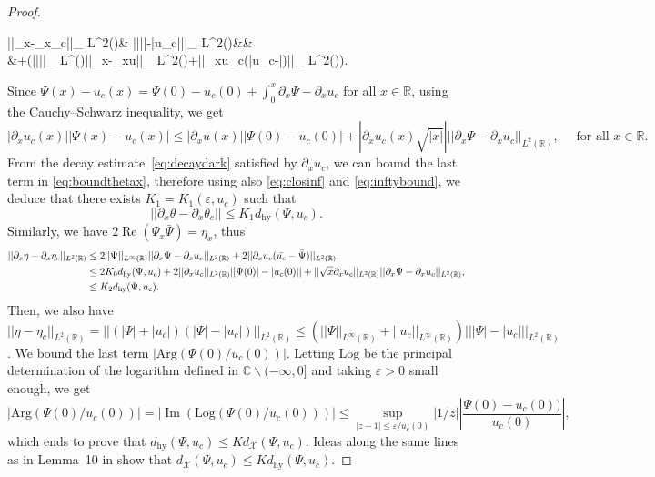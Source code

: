 \documentclass[10pt,a4paper]{amsart}
\newcommand{\C}{\mathbb{C}}
\renewcommand{\Im}{\operatorname{Im}}
\newcommand{\R}{\mathbb{R}}
\renewcommand{\Re}{\operatorname{Re}}
\begin{document}
\begin{proof}
		\begin{flalign}\label{eq:boundthetax}
			\hspace{1.3cm} ||\partial_x\theta-\partial_x\theta_c||_{ L^2(\R)}\leq& \frac{\Im(\partial_xu_c\bar{u_c})(||\Psi||_{ L^\infty(\R)}+||u_c||_{ L^\infty(\R)})}{\inf_{\R}|\Psi|^2\inf_\R|u_c|^2}|||\Psi|-|u_c|||_{ L^2(\R)}&&\notag\\
			&+\frac{1}{\inf_\R|\Psi|^2}\left(||\Psi||_{ L^\infty(\R)}||\partial_x\Psi-\partial_xu||_{ L^2(\R)}+||\partial_xu_c(\bar{u_c}-\bar{\Psi})||_{ L^2(\R)}\right).
		\end{flalign}
		Since $\Psi(x)-u_c(x)=\Psi(0)-u_c(0)+\int_{0}^x\partial_x\Psi-\partial_xu_c$ for all $x\in\R$, using the Cauchy--Schwarz inequality, we get
		\begin{equation}
			|\partial_xu_c(x)||\Psi(x)-u_c(x)|\leq|\partial_xu(x)||\Psi(0)-u_c(0)|+|\partial_{x}u_c(x)\sqrt{|x|}|||\partial_x\Psi-\partial_xu_c||_{ L^2(\R)},\quad\text{ for all }x\in\R.
		\end{equation}
		From the decay estimate~\eqref{eq:decaydark} satisfied by $\partial_xu_c$, we can bound the last term in \eqref{eq:boundthetax}, therefore using also \eqref{eq:closinf} and \eqref{eq:inftybound}, we deduce that there exists $K_1=K_1(\varepsilon,u_c)$ such that 
		\begin{equation}\label{eq:equivtheta}
			||\partial_x\theta-\partial_x\theta_c||\leq K_1d_{\mathrm{hy}}(\Psi,u_c).	
		\end{equation}
		Similarly, we have $2\Re(\Psi_x\bar\Psi)=\eta_x$, thus 
		\begin{align}
			||\partial_x\eta-\partial_x\eta_c||_{ L^2(\R)}&\leq2||\Psi||_{ L^\infty(\R)}||\partial_x\Psi-\partial_xu_c||_{ L^2(\R)}+2||\partial_x{u_c}(\bar{u_c}-\bar\Psi)||_{ L^2(\R)},\notag\\
			&\leq2K_0d_{\mathrm{hy}}(\Psi,u_c)+2||\partial_xu_c||_{ L^2(\R)}||\Psi(0)|-|u_c(0)||+||\sqrt{x}\partial_xu_c||_{ L^2(\R)}|| \partial_x\Psi-\partial_xu_c||_{ L^2(\R)}\notag,\\
			&\leq K_2 d_{\mathrm{hy}}(\Psi,u_c).
		\end{align}
		Then, we also have $||\eta-\eta_c||_{ L^2(\R)}=||(|\Psi|+|u_c|)(|\Psi|-|u_c|)||_{ L^2(\R)}\leq(||\Psi||_{ L^\infty(\R)}+||u_c||_{ L^\infty(\R)})|||\Psi|-|u_c|||_{ L^2(\R)}$.
		We bound the last term $|\mathrm{Arg}(\Psi(0)/u_c(0))|$. Letting $\mathrm{Log}$ be the principal determination of the logarithm defined in $\C\backslash(-\infty,0]$ and taking $\varepsilon>0$ small enough, we get $$|\mathrm{Arg}(\Psi(0)/u_c(0))|=|\Im (\mathrm{Log}(\Psi(0)/u_c(0)))|\leq \sup_{|z-1|\leq\varepsilon/u_c(0)}|1/z|\left|\frac{\Psi(0)-u_c(0))}{u_c(0)}\right|,$$ which ends to prove that $d_{\mathrm{hy}}(\Psi,u_c)\leq K d_{\mathcal{X}}(\Psi,u_c)$.
		Ideas along the same lines as in Lemma~10 in \cite{chiron-stability} show that $d_{\mathcal{X}}(\Psi,u_c)\leq K d_{\mathrm{hy}}(\Psi,u_c)$.
	\end{proof}
\end{document}
